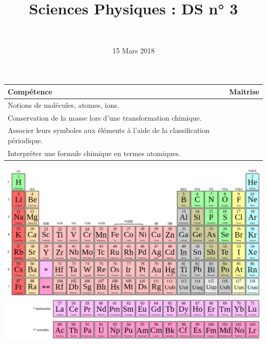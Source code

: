 \documentclass[a4paper,11pt]{exam}
\author{\ }
\date{15 Mars 2018}
\title{Sciences Physiques : DS n° 3}
\begin{document}
%	

	\maketitle
	
\begin{small}
	\begin{center}
		\begin{tabular}{|@{\ }l@{}|@{\ }c@{\ }|}
			\hline
			\textbf{Compétence} & \textbf{Maitrise} \\
			\hline
		Notions de molécules, atomes, ions. \ \ &  \ \ \ \\
			\hline
			Conservation de la masse lors d’une transformation chimique. &  \\
			\hline			
			Associer leurs symboles aux éléments à l’aide de la classification périodique. \ &  \\
			\hline
			Interpréter une formule chimique en termes atomiques. &  \\
			\hline
		\end{tabular}
	\end{center}
\end{small}	
	
	
\vspace*{-0.5cm}	

%

%












\newpage






\newpage 



\newpage 





 
\newpage

\includegraphics [scale=0.5, angle= 90 ]{img/tableau} \label{LastPage}
\end{document}
